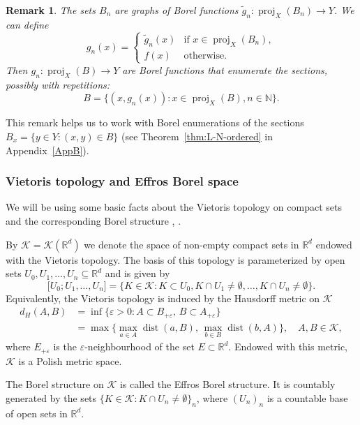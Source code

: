 \documentclass[11pt]{paper}
\newtheorem*{remark*}{Remark}
\newcommand{\bR}{\mathbb R}
\newcommand{\bN}{\mathbb N}
\newcommand{\cK}{\mathcal K}
\newcommand{\eps}{\varepsilon}
\begin{document}
\begin{remark*}
  \label{rem:uniformization-list}
{\rm   The sets \(B_{n}\) are graphs of Borel functions
  \(\widetilde{g}_{n}\colon  \operatorname{proj}_{X}(B_{n}) \to Y\).  We can define
  \[g_{n}(x) =
    \begin{cases}
      \tilde{g}_{n}(x) & \text{if \(x \in \operatorname{proj}_{X}(B_{n})\)}, \\
      f(x) & \text{otherwise}.
    \end{cases}
  \]
  Then \(g_{n}\colon \operatorname{proj}_{X}(B) \to Y\) are Borel functions that enumerate the
  sections, possibly with repetitions:
\[B = \{(x,g_{n}(x))\colon x \in \operatorname{proj}_{X}(B), n \in \bN\}.\]
}
 \end{remark*}
\noindent This remark helps us to work with Borel enumerations of the sections
$B_x = \{y \in Y\colon  (x,y) \in B\}$ (see Theorem~\ref{thm:L-N-ordered} in Appendix~\ref{AppB}).


\subsubsection*{Vietoris topology and Effros Borel space}
We will be using some basic facts about the Vietoris topology on compact sets and the corresponding
Borel structure \cite[pages 66--69, 97--98]{Srivastava}, \cite[pages 24--28, 75--77]{Kechris}.

By $\cK = \cK(\bR^d)$ we denote the space of non-empty compact sets in $\bR^d$ endowed with the Vietoris topology.
The basis of this topology is parameterized by open sets $U_0, U_1, \ldots , U_n \subseteq \bR^d$ and is given
by
\[
\bigl[ U_0; U_1,  \ldots , U_n \bigr]
= \bigl\{ K\in\cK\colon K\subset U_0, K \cap U_1 \ne \emptyset, \ldots ,
K\cap U_n \ne \emptyset \bigr\}.
\]
Equivalently, the Vietoris topology is induced by the Hausdorff metric on $\cK$
\begin{align*}
d_H(A, B) &= \inf\bigl\{\eps>0\colon A\subset B_{+\eps}, \, B\subset A_{+\eps} \bigr\} \\
&= \max\bigl\{ \max_{a\in A} \operatorname{dist}(a, B),  \, \max_{b\in B} \operatorname{dist}(b, A) \bigr\},
\quad A, B \in \cK,
\end{align*}
where $E_{+\eps}$ is the $\eps$-neighbourhood of the set $E\subset \bR^d$.
Endowed with this metric, $\cK$ is a Polish metric space.

The Borel structure on $\cK$ is called the Effros Borel structure. It is countably generated by the sets
$\bigl\{K\in \cK\colon K\cap U_n \ne \emptyset \bigr\}_n$, where $(U_n)_n$ is a countable base of open sets
in $\bR^d$.
\end{document}
